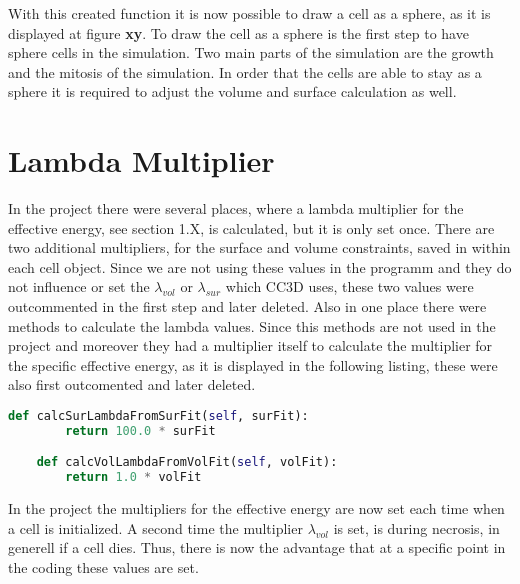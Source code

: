 With this created function it is now possible to draw a cell as a sphere, as it is displayed at figure \textbf{xy}. \newline
To draw the cell as a sphere is the first step to have sphere cells in the simulation. Two main parts of the simulation are the growth and the mitosis of the simulation. In order that the cells are able to stay as a sphere it is required to adjust the volume and surface calculation as well.

\section{Lambda Multiplier}
In the project there were several places, where a lambda multiplier for the effective energy, see section 1.X, is calculated, but it is only set once. There are two additional multipliers, for the surface and volume constraints, saved in within each cell object. Since we are not using these values in the programm and they do not influence or set the $\lambda_{vol}$ or $\lambda_{sur}$ which \ac{CC3D} uses, these two values were outcommented in the first step and later deleted. \newline 
Also in one place there were methods to calculate the lambda values. Since this methods are not used in the project and moreover they had a multiplier itself to calculate the multiplier for the specific effective energy, as it is displayed in the following listing, these were also first outcomented and later deleted.
\begin{lstlisting}[language=Python, caption= methods to calculate the $\lambda_{vol}$ and $\lambda_{sur}$ for the effective energy]
    def calcSurLambdaFromSurFit(self, surFit):
        return 100.0 * surFit

    def calcVolLambdaFromVolFit(self, volFit):
        return 1.0 * volFit
\end{lstlisting}

In the project the multipliers for the effective energy are now set each time when a cell is initialized. A second time the multiplier $\lambda_{vol}$ is set, is during necrosis, in generell if a cell dies. Thus, there is now the advantage that at a specific point in the coding these values are set.





